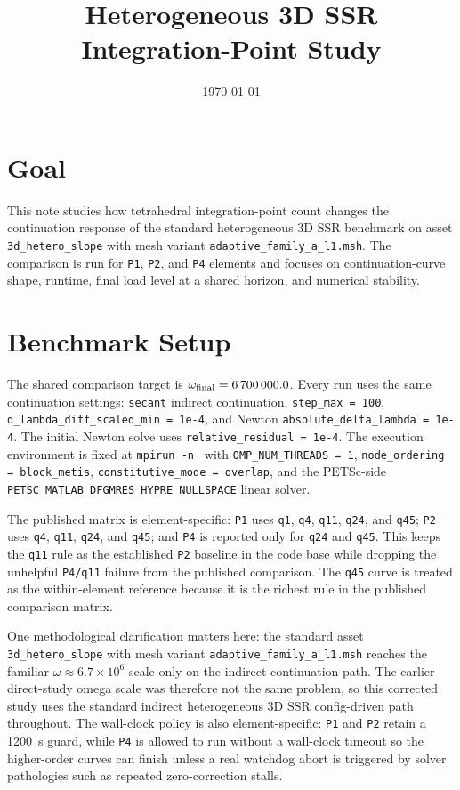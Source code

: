 \documentclass[11pt,a4paper]{article}
\title{Heterogeneous 3D SSR Integration-Point Study}
\author{}
\date{\today}
\begin{document}
\maketitle

\section{Goal}
This note studies how tetrahedral integration-point count changes the continuation response of the standard heterogeneous 3D SSR benchmark on asset \texttt{3d\_hetero\_slope} with mesh variant \texttt{adaptive\_family\_a\_l1.msh}. The comparison is run for \texttt{P1}, \texttt{P2}, and \texttt{P4} elements and focuses on continuation-curve shape, runtime, final load level at a shared horizon, and numerical stability.

\section{Benchmark Setup}
The shared comparison target is $\omega_{\mathrm{final}} = \num{6700000.0}$. Every run uses the same continuation settings: \texttt{secant} indirect continuation, \texttt{step\_max = 100}, \texttt{d\_lambda\_diff\_scaled\_min = 1e-4}, and Newton \texttt{absolute\_delta\_lambda = 1e-4}. The initial Newton solve uses \texttt{relative\_residual = 1e-4}. The execution environment is fixed at \texttt{mpirun -n \StudyMpiRanks} with \texttt{OMP\_NUM\_THREADS = 1}, \texttt{node\_ordering = block\_metis}, \texttt{constitutive\_mode = overlap}, and the PETSc-side \texttt{PETSC\_MATLAB\_DFGMRES\_HYPRE\_NULLSPACE} linear solver.

The published matrix is element-specific: \texttt{P1} uses \texttt{q1}, \texttt{q4}, \texttt{q11}, \texttt{q24}, and \texttt{q45}; \texttt{P2} uses \texttt{q4}, \texttt{q11}, \texttt{q24}, and \texttt{q45}; and \texttt{P4} is reported only for \texttt{q24} and \texttt{q45}. This keeps the \texttt{q11} rule as the established \texttt{P2} baseline in the code base while dropping the unhelpful \texttt{P4/q11} failure from the published comparison. The \texttt{q45} curve is treated as the within-element reference because it is the richest rule in the published comparison matrix.

One methodological clarification matters here: the standard asset \texttt{3d\_hetero\_slope} with mesh variant \texttt{adaptive\_family\_a\_l1.msh} reaches the familiar $\omega \approx 6.7\times 10^6$ scale only on the indirect continuation path. The earlier direct-study omega scale was therefore not the same problem, so this corrected study uses the standard indirect heterogeneous 3D SSR config-driven path throughout.
The wall-clock policy is also element-specific: \texttt{P1} and \texttt{P2} retain a \SI{1200}{s} guard, while \texttt{P4} is allowed to run without a wall-clock timeout so the higher-order curves can finish unless a real watchdog abort is triggered by solver pathologies such as repeated zero-correction stalls.
\end{document}
